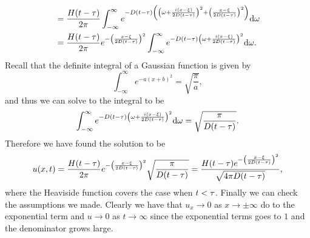 \documentclass[12pt]{report}
\begin{document}
\begin{solution}
\begin{enumerate}
\begin{align*}
            &= \frac{H(t-\tau)}{2\pi} \int_{-\infty}^{\infty} e^{-D(t - {\tau}){\left({\left({\omega} + \frac{i (x - {\xi})}{2D(t-{\tau})}\right)}^2 + {\left(\frac{x-{\xi}}{2D(t- {\tau})}\right)}^2\right)}} {\mathrm{d}}{\omega}\\
            &= \frac{H(t-\tau)}{2\pi}e^{-{\left(\frac{x-{\xi}}{2D(t- {\tau})}\right)}^2} \int_{-\infty}^{\infty} e^{-D(t - {\tau}){\left({\omega} + \frac{i (x - {\xi})}{2D(t-{\tau})}\right)}^2} {\mathrm{d}}{\omega}.\\
        \end{align*}
        Recall that the definite integral of a Gaussian function is given by 
        \[ 
            \int_{-\infty}^{\infty}e^{-a(x+b)^2} = \sqrt{\frac{\pi}{a}},
        \]
        and thus we can solve to the integral to be
        \[ 
            \int_{-\infty}^{\infty} e^{-D(t - {\tau}){\left({\omega} + \frac{i (x - {\xi})}{2D(t-{\tau})}\right)}^2} {\mathrm{d}}{\omega} = \sqrt{\frac{\pi}{D(t-{\tau})}}. 
        \]
        Therefore we have found the solution to be
        \[
            u(x,t) = \frac{H(t-\tau)}{2\pi}e^{-{\left(\frac{x-{\xi}}{2D(t- {\tau})}\right)}^2}\sqrt{\frac{\pi}{D(t-{\tau})}} = \frac{H(t - \tau)e^{-{\left(\frac{x-{\xi}}{2D(t- {\tau})}\right)}^2}}{\sqrt{4\pi D(t - {\tau})}},
        \]
        where the Heaviside function covers the case when $t < {\tau}$. Finally we can check the assumptions we made. Clearly we have that $u_x \to 0$ as $x \to \pm \infty$ do to the exponential term and $u \to 0$ as $t \to \infty$ since the exponential terms goes to $1$ and the denominator grows large. 


\end{enumerate}
\end{solution}
\end{document}
